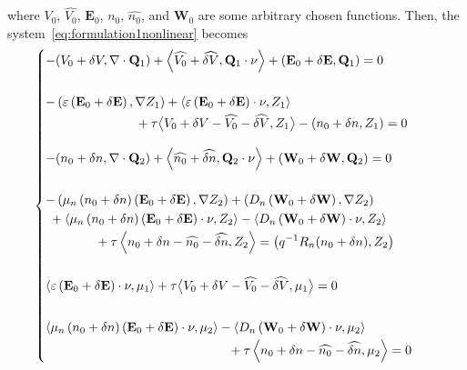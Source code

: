 \documentclass[a4paper,12pt]{article}
\newcommand{\diver}[1]{\ensuremath{\nabla \cdot #1}}
\begin{document}
where  $V_0$, $\widehat{V_{0}}$, $\mathbf{E}_0$, $n_0$, $\widehat{n_{0}}$, and $\mathbf{W}_0$ are 
some arbitrary chosen functions. Then, the system~\ref{eq:formulation1nonlinear} becomes
\begin{equation} \label{eq:horrible}
 \begin{cases}
  -(V_0 + \delta V, \diver{\mathbf{Q}_{1}}) + \left<\widehat{V_{0}} + \widehat{\delta V}, 
      \mathbf{Q}_{1} \cdot \nu \right> + \left(\mathbf{E}_{0} + \delta \mathbf{E}, \mathbf{Q}_{1} 
      \right) = 0 \\[20pt]
  \begin{aligned}
  - \left(\varepsilon \left(\mathbf{E}_{0} + \delta \mathbf{E}\right), \nabla Z_{1}\right) + 
       \left<\varepsilon \left(\mathbf{E}_{0} + \delta \mathbf{E}\right) \cdot \nu, 
       Z_{1}\right> \\ & \hspace{-122pt} + \tau \big< V_{0} + \delta V - \widehat{V_{0}} - 
      \widehat{\delta V}, Z_{1} \big> - (n_{0} + \delta n , Z_{1}) = 0
  \end{aligned} \\[20pt]
  -(n_{0} + \delta n, \diver{\mathbf{Q}_{2}}) + \left<\widehat{n_{0}} + \widehat{\delta n}, 
      \mathbf{Q}_{2} \cdot \nu \right> + 
      \left(\mathbf{W}_{0} + \delta \mathbf{W}, \mathbf{Q}_{2} \right) = 0 \\[20pt]
  \begin{aligned}
  - \left(\mu_n \left(n_{0} + \delta n \right) \left(\mathbf{E}_{0} + \delta \mathbf{E}\right), 
      \nabla Z_{2} \right) + \left( D_n \left(\mathbf{W}_{0} + \delta \mathbf{W}\right), \nabla 
      Z_{2} \right) \\
      & \hspace{-255pt} + \left<\mu_n \left(n_{0} + \delta n \right) \left(\mathbf{E}_{0} + \delta 
      \mathbf{E}\right) \cdot \nu, Z_{2} \right> - \left< D_n \left(\mathbf{W}_{0} + \delta 
      \mathbf{W}\right) \cdot \nu, Z_{2} \right> \\
      & \hspace{-219pt} + \tau \left< n_{0} + \delta n - \widehat{n_{0}} - \widehat{\delta 
      n}, Z_{2} \right>  = \left({q^{-1}}R_n(n_{0} + \delta n), Z_2\right)
  \end{aligned} \\[35pt]
  \left<\varepsilon \left(\mathbf{E}_{0} + \delta \mathbf{E}\right) \cdot \nu, \mu_{1}\right> + 
      \tau \big< V_{0} + \delta V - \widehat{V_{0}} - \widehat{\delta V}, \mu_{1} \big> = 0 \\[20pt]
  \begin{aligned}
  \left<\mu_n \left(n_{0} + \delta n \right) \left(\mathbf{E}_{0} + \delta \mathbf{E}\right) \cdot 
      \nu, \mu_{2} \right> - \left<D_n \left(\mathbf{W}_{0} + \delta \mathbf{W}\right) \cdot \nu, 
      \mu_{2} \right> \\ & \hspace{-108pt} + \tau \left< n_{0} + \delta n - \widehat{n_{0}} - 
      \widehat{\delta n}, \mu_{2} \right> = 0
  \end{aligned}
 \end{cases}
\end{equation}
\end{document}
